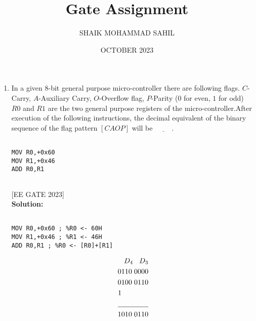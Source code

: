 \documentclass{article}
\title{Gate Assignment}
\author{SHAIK MOHAMMAD SAHIL}
\date{OCTOBER 2023}
\begin{document}
\maketitle

\begin{enumerate}
\item In a given $8$-bit general purpose micro-controller there are following flags. $C$-Carry, $A$-Auxiliary Carry, $O$-Overflow flag, $P$-Parity ($0$ for even, $1$ for odd) $R0$ and $R1$ are the two general purpose registers of the micro-controller.After execution of the following instructions, the decimal equivalent of the binary sequence of the flag pattern $[CAOP]$ will be $\underline{\hspace{1cm}}$.\\


\begin{listing}[h]
\begin{verbatim}

MOV R0,+0x60
MOV R1,+0x46 
ADD R0,R1


\end{verbatim}
\end{listing}
    
\hfill{[EE GATE 2023]}\\

\textbf{Solution:}\\

\begin{listing}[h]
\begin{verbatim}

MOV R0,+0x60 ; %R0 <- 60H
MOV R1,+0x46 ; %R1 <- 46H
ADD R0,R1 ; %R0 <- [R0]+[R1]

\end{verbatim}
\end{listing}

\begin{align*}
D_{4} \hspace{0.3cm}  D_{3}\\
0110 \hspace{0.1cm} 0000\\
0100 \hspace{0.1cm} 0110\\
1 \hspace{1.32cm}\\
\underline{\hspace{1.5cm}}\\	
1010 \hspace{0.1cm}  0110
\end{align*}


\end{enumerate}
\end{document}
